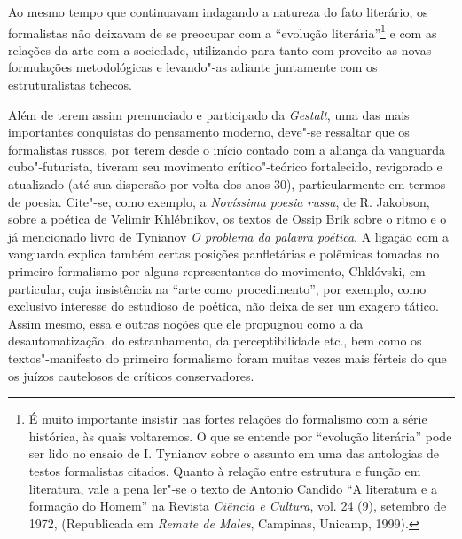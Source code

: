 Ao mesmo tempo que continuavam indagando a natureza do fato literário,
os formalistas não deixavam de se preocupar com a ``evolução literária''\footnote{É muito importante insistir nas fortes relações do formalismo
  com a série histórica, às quais voltaremos. O que se entende por
  ``evolução literária'' pode ser lido no ensaio de I. Tynianov sobre o
  assunto em uma das antologias de testos formalistas citados. Quanto à
  relação entre estrutura e função em literatura, vale a pena ler"-se o
  texto de Antonio Candido ``A literatura e a formação do
  Homem'' na Revista \emph{Ciência e Cultura}, vol. 24 (9), setembro de
  1972, (Republicada em \emph{Remate de Males}, Campinas, Unicamp,
  1999).} e com as relações da arte com a sociedade, utilizando para
tanto com proveito as novas formulações metodológicas e levando"-as
adiante juntamente com os estruturalistas tchecos.

Além de terem assim prenunciado e participado da \emph{Gestalt}, uma das
mais importantes conquistas do pensamento moderno, deve"-se ressaltar que
os formalistas russos, por terem desde o início contado com a aliança da
vanguarda cubo"-futurista, tiveram seu movimento crítico"-teórico
fortalecido, revigorado e atualizado (até sua dispersão por volta dos
anos 30), particularmente em termos de poesia. Cite"-se, como exemplo, a
\emph{Novíssima poesia russa}, de R. Jakobson, sobre a poética de Velimir
Khlébnikov, os textos de Ossip Brik sobre o ritmo e o já mencionado
livro de Tynianov \emph{O problema da palavra poética}. A ligação com a
vanguarda explica também certas posições panfletárias e polêmicas
tomadas no primeiro formalismo por alguns representantes do movimento,
Chklóvski, em particular, cuja insistência na ``arte como
procedimento'', por exemplo, como exclusivo interesse do estudioso de
poética, não deixa de ser um exagero tático. Assim mesmo, essa e outras noções que ele propugnou como a
da desautomatização, do estranhamento, da perceptibilidade etc., bem
como os textos"-manifesto do primeiro formalismo foram muitas vezes mais
férteis do que os juízos cautelosos de críticos conservadores.

